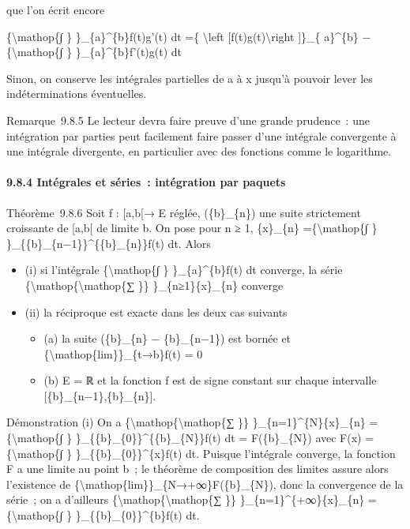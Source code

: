 \documentclass[]{article}
\begin{document}
que l'on écrit encore

\{\textbackslash{}mathop\{∫ \} \}\_\{a\}\^{}\{b\}f(t)g'(t) dt =\{
\textbackslash{}left {[}f(t)g(t)\textbackslash{}right {]}\}\_\{
a\}\^{}\{b\} −\{\textbackslash{}mathop\{∫ \} \}\_\{a\}\^{}\{b\}f'(t)g(t)
dt

Sinon, on conserve les intégrales partielles de a à x jusqu'à pouvoir
lever les indéterminations éventuelles.

Remarque~9.8.5 Le lecteur devra faire preuve d'une grande prudence~: une
intégration par parties peut facilement faire passer d'une intégrale
convergente à une intégrale divergente, en particulier avec des
fonctions comme le logarithme.

\paragraph{9.8.4 Intégrales et séries~: intégration par paquets}

Théorème~9.8.6 Soit f : {[}a,b{[}→ E réglée, (\{b\}\_\{n\}) une suite
strictement croissante de {[}a,b{[} de limite b. On pose pour n ≥ 1,
\{x\}\_\{n\} =\{\textbackslash{}mathop\{∫ \}
\}\_\{\{b\}\_\{n−1\}\}\^{}\{\{b\}\_\{n\}\}f(t) dt. Alors

\begin{itemize}
\itemsep1pt\parskip0pt
\item
  (i) si l'intégrale \{\textbackslash{}mathop\{∫ \}
  \}\_\{a\}\^{}\{b\}f(t) dt converge, la série
  \{\textbackslash{}mathop\{\textbackslash{}mathop\{∑ \}\}
  \}\_\{n≥1\}\{x\}\_\{n\} converge
\item
  (ii) la réciproque est exacte dans les deux cas suivants

  \begin{itemize}
  \itemsep1pt\parskip0pt
  \item
    (a) la suite (\{b\}\_\{n\} − \{b\}\_\{n−1\}) est bornée et
    \{\textbackslash{}mathop\{lim\}\}\_\{t→b\}f(t) = 0
  \item
    (b) E = ℝ et la fonction f est de signe constant sur chaque
    intervalle {[}\{b\}\_\{n−1\},\{b\}\_\{n\}{]}.
  \end{itemize}
\end{itemize}

Démonstration (i) On a
\{\textbackslash{}mathop\{\textbackslash{}mathop\{∑ \}\}
\}\_\{n=1\}\^{}\{N\}\{x\}\_\{n\} =\{\textbackslash{}mathop\{∫ \}
\}\_\{\{b\}\_\{0\}\}\^{}\{\{b\}\_\{N\}\}f(t) dt = F(\{b\}\_\{N\}) avec
F(x) =\{\textbackslash{}mathop\{∫ \} \}\_\{\{b\}\_\{0\}\}\^{}\{x\}f(t)
dt. Puisque l'intégrale converge, la fonction F a une limite au point
b~; le théorème de composition des limites assure alors l'existence de
\{\textbackslash{}mathop\{lim\}\}\_\{N→+∞\}F(\{b\}\_\{N\}), donc la
convergence de la série~; on a d'ailleurs
\{\textbackslash{}mathop\{\textbackslash{}mathop\{∑ \}\}
\}\_\{n=1\}\^{}\{+∞\}\{x\}\_\{n\} =\{\textbackslash{}mathop\{∫ \}
\}\_\{\{b\}\_\{0\}\}\^{}\{b\}f(t) dt.
\end{document}
